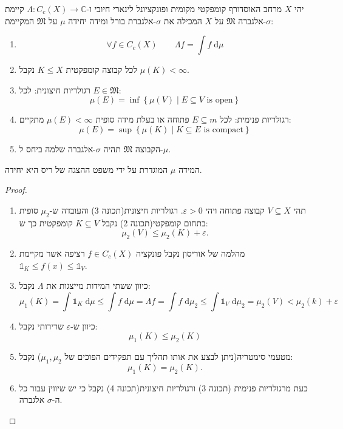 \documentclass{tstextbook}
\begin{document}
\begin{theorem}
יהי \(X\) מרחב האוסדורף קומפקטי מקומית ופונקציונל לינארי חיובי ו-\(\Lambda:C_{c}(X)\to \mathbb{C}\) קיימת \(\sigma\)-אלגברה \(\mathfrak{M}\) על \(X\) המכילה את \(\sigma\)-אלגברת בורל ומידה יחידה \(\mu\) על \(\mathfrak{M}\) המקיימת:

  \begin{enumerate}
    \item $$\forall f \in C_{c}(X)\qquad \Lambda f=\int f \;\mathrm{d} \mu $$


    \item לכל קבוצה קומפקטית \(K\leq X\)  נקבל \(\mu(K)< \infty\). 


    \item רגולריות חיצונית: לכל \(E \in \mathfrak{M}\): 
$$\mu(E)=\inf \left\{  \mu(V) \mid E\subseteq V \text{ is open} \right\}$$


    \item רגולריות פנימית: לכל \(E \subseteq m\) פתוחה או בעלת מידה סופית \(\mu(E)<\infty\) מתקיים: 
$$\mu(E)= \sup \left\{  \mu(K)\mid K\subseteq E\text{ is compact}  \right\}$$


    \item הקבוצה \(\mathfrak{M}\) תהיה \(\sigma\)-אלגברה שלמה ביחס ל-\(\mu\). 


  \end{enumerate}
\end{theorem}
\begin{proposition}
המידה \(\mu\) המוגדרת על ידי משפט ההצגה של ריס היא יחידה.

\end{proposition}
\begin{proof}
  \begin{enumerate}
    \item תהי \(V\subseteq X\) קבוצה פתוחה ויהי \(\varepsilon> 0\). רגולריות חיצונית(תכונה 3) והעובדה ש-\(\mu_{2}\) סופית בתחום קומפקטי(תכונה 2) נקבל \(K\subseteq V\) קומפקטית כך ש: 
$$\mu_{2}(V)\leq\mu_{2}(K)+\varepsilon.$$


    \item מהלמה של אוריסון נקבל פונקציה \(f \in C_{c}(X)\) רציפה אשר מקיימת \(\mathbb{1}_{K}\leq f(x)\leq \mathbb{1}_{V}\).  


    \item כיוון ששתי המידות מייצגות את \(\Lambda\) נקבל: 
$$\mu_{1}(K)=\int \mathbb{1} _{K} \;\mathrm{d} \mu \leq \int f \;\mathrm{d}\mu = \Lambda f=\int f \;\mathrm{d} \mu_{2}\leq \int \mathbb{1} _{V} \;\mathrm{d} \mu_{2} = \mu_{2}(V)<\mu_{2}(k)+\varepsilon    $$


    \item כיוון ש-\(\varepsilon\) שרירותי נקבל: 
$$\mu_{1}(K)\leq\mu_{2}(K)$$


    \item מטעמי סימטריה(ניתן לבצע את אותו תהליך עם תפקידים הפוכים של \(\mu_{1},\mu_{2}\)) נקבל: 
$$\mu_{1}(K)=\mu_{2}(K).$$


    \item כעת מרגולריות פנימית (תכונה 3) ורגולריות חיצונית(תכונה 4) נקבל כי יש שיווין עבור כל ה-\(\sigma\) אלגברה. 


  \end{enumerate}
\end{proof}
\end{document}
